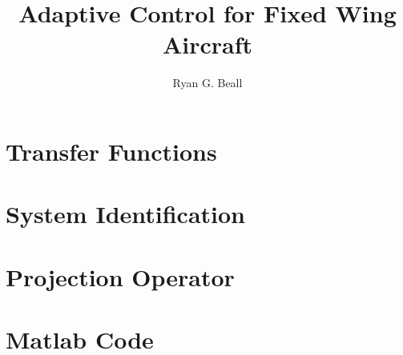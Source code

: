 \documentclass[twoside,thesis,twoadvisorsreader]{npsreport}
\title{Adaptive Control for Fixed Wing Aircraft}
\author{Ryan G. Beall}
\begin{document}
\NPScover                  	%
\NPSthesistitle            	%
\NPSabstractpage           	%
\NPSfrontmatter            	%

\renewcommand{\chaptermark}[1]{\markboth{\MakeUppercase{\chaptername}\ \thechapter.\ #1}{}}

%
%
\NPStableOfContents
\NPSlistOfFigures
\NPSlistOfTables
{}



\NPSbody




%

\NPSappendices

\chapter{Transfer Functions}


\chapter{System Identification}


\chapter{Projection Operator}


\chapter{Matlab Code}

\end{document}
